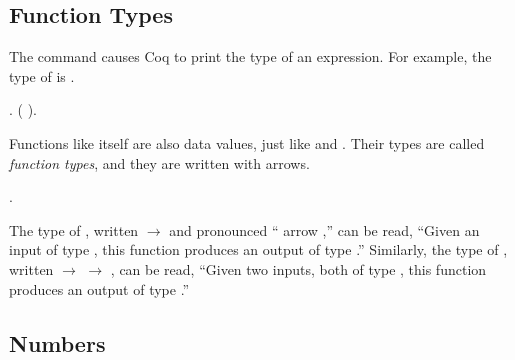 \documentclass[12pt]{report}
\begin{document}
\subsection{Function Types}



 The  command causes Coq to print the type of an
    expression.  For example, the type of   is . \begin{coqdoccode}
\coqdocemptyline
\coqdocnoindent
{} .\coqdoceol
\coqdocnoindent
{} ( ).\coqdoceol
\coqdocemptyline
\end{coqdoccode}
Functions like  itself are also data values, just like
     and .  Their types are called \textit{function types}, and
    they are written with arrows. \begin{coqdoccode}
\coqdocemptyline
\coqdocnoindent
{} .\coqdoceol
\coqdocemptyline
\end{coqdoccode}
The type of , written  \ensuremath{\rightarrow}  and pronounced
    `` arrow ,'' can be read, ``Given an input of type
    , this function produces an output of type .''
    Similarly, the type of , written  \ensuremath{\rightarrow}  \ensuremath{\rightarrow} , can
    be read, ``Given two inputs, both of type , this function
    produces an output of type .'' \begin{coqdoccode}
\coqdocemptyline
\end{coqdoccode}
\subsection{Numbers}
\end{document}
